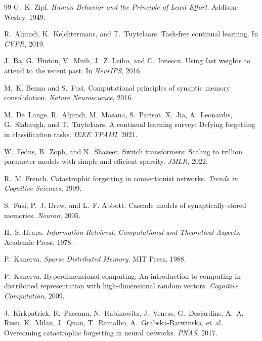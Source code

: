 \documentclass[11pt,a4paper]{article}
\begin{document}
\begin{thebibliography}{99}
G.~K. Zipf.
\newblock \emph{Human Behavior and the Principle of Least Effort}.
\newblock Addison-Wesley, 1949.

R.~Aljundi, K.~Kelchtermans, and T.~Tuytelaars.
\newblock Task-free continual learning.
\newblock In \emph{CVPR}, 2019.

J.~Ba, G.~Hinton, V.~Mnih, J.~Z. Leibo, and C.~Ionescu.
\newblock Using fast weights to attend to the recent past.
\newblock In \emph{NeurIPS}, 2016.

M.~K. Benna and S.~Fusi.
\newblock Computational principles of synaptic memory consolidation.
\newblock \emph{Nature Neuroscience}, 2016.

M.~De~Lange, R.~Aljundi, M.~Masana, S.~Parisot, X.~Jia, A.~Leonardis,
  G.~Slabaugh, and T.~Tuytelaars.
\newblock A continual learning survey: Defying forgetting in classification
  tasks.
\newblock \emph{IEEE TPAMI}, 2021.

W.~Fedus, B.~Zoph, and N.~Shazeer.
\newblock Switch transformers: Scaling to trillion parameter models with simple
  and efficient sparsity.
\newblock \emph{JMLR}, 2022.

R.~M. French.
\newblock Catastrophic forgetting in connectionist networks.
\newblock \emph{Trends in Cognitive Sciences}, 1999.

S.~Fusi, P.~J. Drew, and L.~F. Abbott.
\newblock Cascade models of synaptically stored memories.
\newblock \emph{Neuron}, 2005.

H.~S. Heaps.
\newblock \emph{Information Retrieval: Computational and Theoretical Aspects}.
\newblock Academic Press, 1978.

P.~Kanerva.
\newblock \emph{Sparse Distributed Memory}.
\newblock MIT Press, 1988.

P.~Kanerva.
\newblock Hyperdimensional computing: An introduction to computing in
  distributed representation with high-dimensional random vectors.
\newblock \emph{Cognitive Computation}, 2009.

J.~Kirkpatrick, R.~Pascanu, N.~Rabinowitz, J.~Veness, G.~Desjardins, A.~A. Rusu,
  K.~Milan, J.~Quan, T.~Ramalho, A.~Grabska-Barwinska, et~al.
\newblock Overcoming catastrophic forgetting in neural networks.
\newblock \emph{PNAS}, 2017.


\end{thebibliography}
\end{document}
